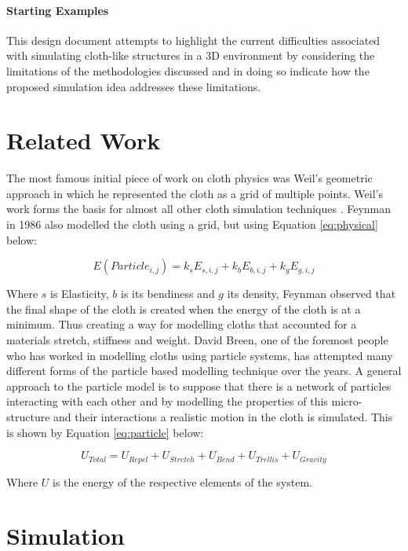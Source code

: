 \documentclass[conference,backref=page]{acmsiggraph}
\begin{document}
\paragraph{Starting Examples}
This design document attempts to highlight the current difficulties associated with simulating cloth-like structures in a 3D environment by considering the limitations of the methodologies discussed and in doing so indicate how the proposed simulation idea addresses these limitations.


\section{Related Work}
The most famous initial piece of work on cloth physics was Weil's geometric approach \cite{Weil} in which he represented the cloth as a grid of multiple points. Weil's work forms the basis for almost all other cloth simulation techniques \cite{Karthikeyan}. Feynman in 1986 also modelled the cloth using a grid, but using Equation \ref{eq:physical} below:

\begin{equation} \label{eq:physical}
	E(Particle_{i,j}) = k_{s}E_{s,i,j} + k_{b}E_{b,i,j} + k_{g}E_{g,i,j}
\end{equation}

Where $s$ is Elasticity, $b$ is its bendiness and $g$ its density, Feynman observed that the final shape of the cloth is created when the energy of the cloth is at a minimum. Thus creating a way for modelling cloths that accounted for a materials stretch, stiffness and weight. David Breen, one of the foremost people who has worked in modelling cloths using particle systems, has attempted many different forms of the particle based modelling technique over the years. A general approach to the particle model is to suppose that there is a network of particles interacting with each other and by modelling the properties of this micro-structure and their interactions a realistic motion in the cloth is simulated. This is shown by Equation \ref{eq:particle} below:

\begin{equation} \label{eq:particle}
U_{Total} = U_{Repel} + U_{Stretch} + U_{Bend} + U_{Trellis} + U_{Gravity}
\end{equation}

Where $U$ is the energy of the respective elements of the system.

\section{Simulation}
\end{document}
